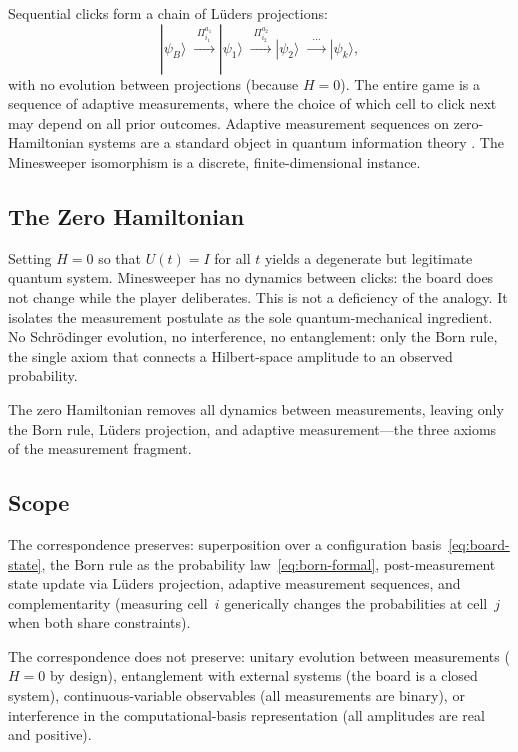 \documentclass[12pt,a4paper]{article}
\theoremstyle{definition}
\theoremstyle{remark}
\newcommand{\ket}[1]{|#1\rangle}
\begin{document}
Sequential clicks form a chain of L\"uders projections:
\[
  \ket{\psi_B}
    \;\xrightarrow{\;\Pi_{i_1}^{a_1}\;}
  \ket{\psi_1}
    \;\xrightarrow{\;\Pi_{i_2}^{a_2}\;}
  \ket{\psi_2}
    \;\xrightarrow{\;\;\cdots\;\;}
  \ket{\psi_k},
\]
with no evolution between projections (because $H = 0$).  The entire
game is a sequence of adaptive measurements, where the choice of
which cell to click next may depend on all prior outcomes.  Adaptive
measurement sequences on zero-Hamiltonian systems are a standard
object in quantum information theory \citep{WisemanMilburn2009}.
The Minesweeper isomorphism is a discrete, finite-dimensional instance.

\subsection{The Zero Hamiltonian}

Setting $H = 0$ so that $U(t) = I$ for all $t$ yields a degenerate
but legitimate quantum system.  Minesweeper has no dynamics between
clicks: the board does not change while the player deliberates.
This is not a deficiency of the analogy.  It isolates the measurement
postulate as the sole quantum-mechanical ingredient.  No Schr\"odinger
evolution, no interference, no entanglement: only the Born rule, the
single axiom that connects a Hilbert-space amplitude to an observed
probability.

The zero Hamiltonian removes all dynamics between measurements,
leaving only the Born rule, L\"uders projection, and adaptive
measurement---the three axioms of the measurement fragment.

\subsection{Scope}

The correspondence preserves: superposition over a configuration
basis~\eqref{eq:board-state}, the Born rule as the probability
law~\eqref{eq:born-formal}, post-measurement state update via
L\"uders projection, adaptive measurement sequences, and
complementarity (measuring cell~$i$ generically changes the
probabilities at cell~$j$ when both share constraints).

The correspondence does not preserve: unitary evolution between
measurements ($H = 0$ by design), entanglement with external
systems (the board is a closed system), continuous-variable
observables (all measurements are binary), or interference in
the computational-basis representation (all amplitudes are real
and positive).
\end{document}
